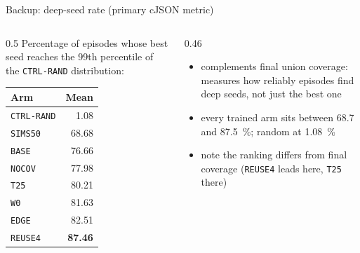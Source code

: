 \documentclass[aspectratio=169,10pt]{beamer}
\newcommand{\arm}[1]{\texttt{#1}}
\begin{document}
\begin{frame}{Backup: deep-seed rate (primary cJSON metric)}
  \begin{columns}[T]
    \begin{column}{0.5\textwidth}
      \footnotesize
      Percentage of episodes whose best seed reaches the 99th percentile of
      the \arm{CTRL-RAND} distribution:
      \medskip

      \begin{tabular}{@{}lr@{}}
        \toprule
        Arm & Mean \\
        \midrule
        \arm{CTRL-RAND} & 1.08 \\
        \arm{SIMS50} & 68.68 \\
        \arm{BASE} & 76.66 \\
        \arm{NOCOV} & 77.98 \\
        \arm{T25} & 80.21 \\
        \arm{W0} & 81.63 \\
        \arm{EDGE} & 82.51 \\
        \arm{REUSE4} & \textbf{87.46} \\
        \bottomrule
      \end{tabular}
    \end{column}
    \begin{column}{0.46\textwidth}
      \begin{itemize}
        \item complements final union coverage: measures how reliably
          episodes find deep seeds, not just the best one
        \item every trained arm sits between \SI{68.7}{} and
          \SI{87.5}{\percent}; random at \SI{1.08}{\percent}
        \item note the ranking differs from final coverage
          (\arm{REUSE4} leads here, \arm{T25} there)
      \end{itemize}
    \end{column}
  \end{columns}
\end{frame}
\end{document}
